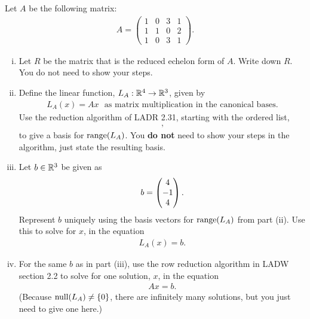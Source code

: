 \begin{question}
    \normalfont

    Let $A$ be the following matrix:
    \begin{align*}
        A =
        \begin{pmatrix}
            1 & 0 & 3 & 1 \\
            1 & 1 & 0 & 2 \\
            1 & 0 & 3 & 1
        \end{pmatrix}.
    \end{align*}

    \begin{enumerate}[(i)]
        \item Let $R$ be the matrix that is the reduced echelon form of $A$.  Write down $R$.  You do not need to show your steps.



        \item Define the linear function, $L_A:{\mathbb R}^4\to{\mathbb R}^3$, given by
              \begin{align*}
                  L_A(x) = Ax\ \ \ \text{as matrix multiplication in the canonical bases}.
              \end{align*}
              Use the reduction algorithm of LADR 2.31, starting with the ordered list,
              \begin{align*}
                  [L_A(e_1), L_A(e_2), L_A(e_3), L_A(e_4)],
              \end{align*}
              to give a basis for $\textnormal{range}(L_A)$.  You \textbf{do not} need to show your steps in the algorithm, just state the resulting basis.


        \item Let $b\in{\mathbb R}^3$ be given as
              \begin{align*}
                  b=\begin{pmatrix} 4\\ -1\\ 4\end{pmatrix}.
              \end{align*}
              Represent $b$ uniquely using the basis vectors for $\textnormal{range}(L_A)$ from part (ii).  Use this to solve for $x$, in the equation
              \begin{align*}
                  L_A(x) = b.
              \end{align*}

        \item For the same $b$ as in part (iii), use the row reduction algorithm in LADW section 2.2 to solve for one solution, $x$, in the equation
              \begin{align*}
                  Ax=b.
              \end{align*}
              (Because $\textnormal{null}(L_A)\not=\{0\}$, there are infinitely many solutions, but you just need to give one here.)



\end{enumerate}
\end{question}
